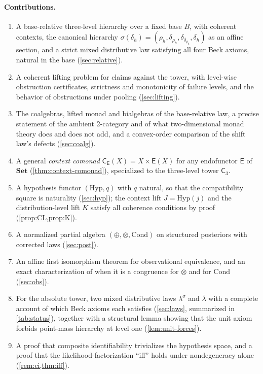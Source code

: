 \documentclass[11pt]{article}
\theoremstyle{definition}
\theoremstyle{remark}
\newcommand{\Set}{\mathbf{Set}}
\newcommand{\Hyp}{\mathrm{Hyp}}
\newcommand{\Cond}{\mathrm{Cond}}
\newcommand{\C}{\mathsf{C}}
\newcommand{\E}{\mathsf{E}}
\newcommand{\lb}{\bar\lambda}
\newcommand{\ls}{\lambda^{\sigma}}
\begin{document}
\paragraph{Contributions.}
\begin{enumerate}[leftmargin=*]
\item A base-relative three-level hierarchy over a fixed base $B$, with coherent contexts, the
  canonical hierarchy $\sigma(\delta_h)=(\rho_h,\delta_{\rho_h},\delta_{\delta_{\rho_h}},\delta_h)$ as an
  affine section, and a strict mixed distributive law satisfying all four Beck axioms, natural in the
  base (\cref{sec:relative}).
\item A coherent lifting problem for claims against the tower, with level-wise obstruction
  certificates, strictness and monotonicity of failure levels, and the behavior of obstructions under
  pooling (\cref{sec:lifting}).
\item The coalgebras, lifted monad and bialgebras of the base-relative law, a precise statement of
  the ambient 2-category and of what two-dimensional monad theory does and does not add, and a
  convex-order comparison of the shift law's defects (\cref{sec:coalg}).
\item A general \emph{context comonad} $\C_\E(X)=X\times\E(X)$ for any endofunctor $\E$ of $\Set$
  (\cref{thm:context-comonad}), specialized to the three-level tower $\C_3$.
\item A hypothesis functor $(\Hyp,q)$ with $q$ natural, so that the compatibility square is
  naturality (\cref{sec:hyp}); the context lift $J=\Hyp(j)$ and the distribution-level lift $K$
  satisfy all coherence conditions by proof (\cref{prop:CL,prop:K}).
\item A normalized partial algebra $(\oplus,\otimes,\Cond)$ on structured posteriors with corrected
  laws (\cref{sec:post}).
\item An affine first isomorphism theorem for observational equivalence, and an exact
  characterization of when it is a congruence for $\otimes$ and for $\Cond$ (\cref{sec:obs}).
\item For the absolute tower, two mixed distributive laws $\ls$ and $\lb$ with a complete account
  of which Beck axioms each satisfies (\cref{sec:laws}, summarized in \cref{tab:status}), together with a structural lemma
  showing that the unit axiom forbids point-mass hierarchy at level one (\cref{lem:unit-forces}).
\item A proof that composite identifiability trivializes the hypothesis space, and a proof that the
  likelihood-factorization ``iff'' holds under nondegeneracy alone (\cref{rem:ci,thm:iff}).
\end{enumerate}
\end{document}
